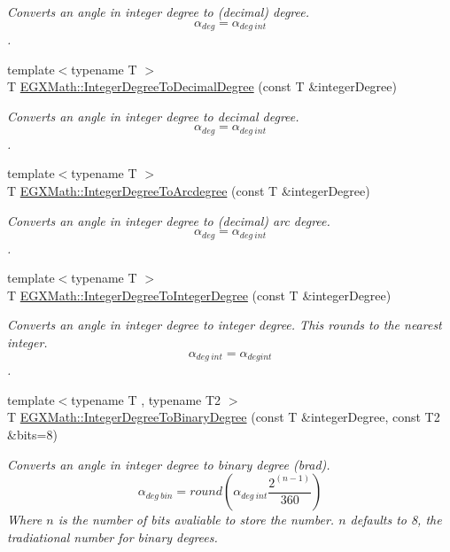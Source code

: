 \begin{DoxyCompactItemize}
\begin{DoxyCompactList}\small\item\em Converts an angle in integer degree to (decimal) degree. \[\alpha_{deg}=\alpha_{deg\ int}\]. \end{DoxyCompactList}\item 
{\footnotesize template$<$typename T $>$ }\\T \mbox{\hyperlink{group___e_g_x_math-_angle_conversions-_integer_degree_gac219c3198508ba984d8d81d22831b27d}{E\+G\+X\+Math\+::\+Integer\+Degree\+To\+Decimal\+Degree}} (const T \&integer\+Degree)
\begin{DoxyCompactList}\small\item\em Converts an angle in integer degree to decimal degree. \[\alpha_{deg}=\alpha_{deg\ int}\]. \end{DoxyCompactList}\item 
{\footnotesize template$<$typename T $>$ }\\T \mbox{\hyperlink{group___e_g_x_math-_angle_conversions-_integer_degree_gaf633d0b82bfb7586ce86ffbcf78d8f7a}{E\+G\+X\+Math\+::\+Integer\+Degree\+To\+Arcdegree}} (const T \&integer\+Degree)
\begin{DoxyCompactList}\small\item\em Converts an angle in integer degree to (decimal) arc degree. \[\alpha_{deg}=\alpha_{deg\ int}\]. \end{DoxyCompactList}\item 
{\footnotesize template$<$typename T $>$ }\\T \mbox{\hyperlink{group___e_g_x_math-_angle_conversions-_integer_degree_gac9e870bdfa60dd2bb61469fdf6eedd7c}{E\+G\+X\+Math\+::\+Integer\+Degree\+To\+Integer\+Degree}} (const T \&integer\+Degree)
\begin{DoxyCompactList}\small\item\em Converts an angle in integer degree to integer degree. This rounds to the nearest integer. \[\alpha_{deg\ int}=\alpha_{deg int}\]. \end{DoxyCompactList}\item 
{\footnotesize template$<$typename T , typename T2 $>$ }\\T \mbox{\hyperlink{group___e_g_x_math-_angle_conversions-_integer_degree_ga694bbfe624c3c14e97ce6155ca9bc44d}{E\+G\+X\+Math\+::\+Integer\+Degree\+To\+Binary\+Degree}} (const T \&integer\+Degree, const T2 \&bits=8)
\begin{DoxyCompactList}\small\item\em Converts an angle in integer degree to binary degree (brad). \[\alpha_{deg\ bin}=round(\alpha_{deg\ int}\frac{2^{(n-1)}}{360})\] Where $n$ is the number of bits avaliable to store the number. $n$ defaults to 8, the tradiational number for binary degrees. \end{DoxyCompactList}\item 

\end{DoxyCompactItemize}
